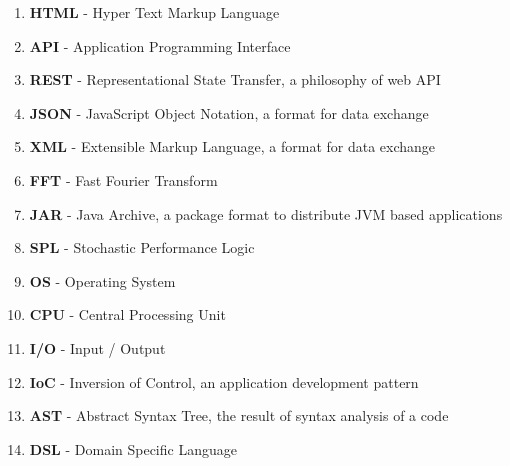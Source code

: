 
\begin{enumerate}
	\item \textbf{HTML} - Hyper Text Markup Language
	\item \textbf{API} - Application Programming Interface
	\item \textbf{REST} - Representational State Transfer, a philosophy of web API
	\item \textbf{JSON} - JavaScript Object Notation, a format for data exchange
	\item \textbf{XML} - Extensible Markup Language, a format for data exchange
	\item \textbf{FFT} - Fast Fourier Transform
	\item \textbf{JAR} - Java Archive, a package format to distribute JVM based applications
	\item \textbf{SPL} - Stochastic Performance Logic
	\item \textbf{OS} - Operating System
	\item \textbf{CPU} - Central Processing Unit
	\item \textbf{I/O} - Input / Output
	\item \textbf{IoC} - Inversion of Control, an application development pattern
	\item \textbf{AST} - Abstract Syntax Tree, the result of syntax analysis of a code
	\item \textbf{DSL} - Domain Specific Language
\end{enumerate}